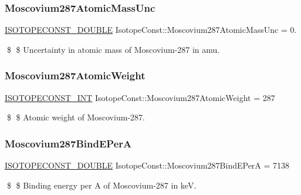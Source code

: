 \subsubsection{\texorpdfstring{Moscovium287\+Atomic\+Mass\+Unc}{Moscovium287AtomicMassUnc}}
{\footnotesize\ttfamily \mbox{\hyperlink{group___isotope_const-_macros_ga8f45a7272ce02c0b4c65c44636ed719a}{I\+S\+O\+T\+O\+P\+E\+C\+O\+N\+S\+T\+\_\+\+D\+O\+U\+B\+LE}} Isotope\+Const\+::\+Moscovium287\+Atomic\+Mass\+Unc = 0.}

\$ \$ Uncertainty in atomic mass of Moscovium-\/287 in amu. \mbox{\label{group___isotope_const-_moscovium-_mc287_ga7713eba99364ff757670f25b0a0c8823}} 
\subsubsection{\texorpdfstring{Moscovium287\+Atomic\+Weight}{Moscovium287AtomicWeight}}
{\footnotesize\ttfamily \mbox{\hyperlink{group___isotope_const-_macros_ga5f18360b3e99483a35c32d789e62621c}{I\+S\+O\+T\+O\+P\+E\+C\+O\+N\+S\+T\+\_\+\+I\+NT}} Isotope\+Const\+::\+Moscovium287\+Atomic\+Weight = 287}

\$ \$ Atomic weight of Moscovium-\/287. \mbox{\label{group___isotope_const-_moscovium-_mc287_ga0e9354fa6b7e8d901394672a15fe5f83}} 
\subsubsection{\texorpdfstring{Moscovium287\+Bind\+E\+PerA}{Moscovium287BindEPerA}}
{\footnotesize\ttfamily \mbox{\hyperlink{group___isotope_const-_macros_ga8f45a7272ce02c0b4c65c44636ed719a}{I\+S\+O\+T\+O\+P\+E\+C\+O\+N\+S\+T\+\_\+\+D\+O\+U\+B\+LE}} Isotope\+Const\+::\+Moscovium287\+Bind\+E\+PerA = 7138}

\$ \$ Binding energy per A of Moscovium-\/287 in keV. \mbox{\label{group___isotope_const-_moscovium-_mc287_ga9c03020514dd0c78b4bac49212ce0486}} 
